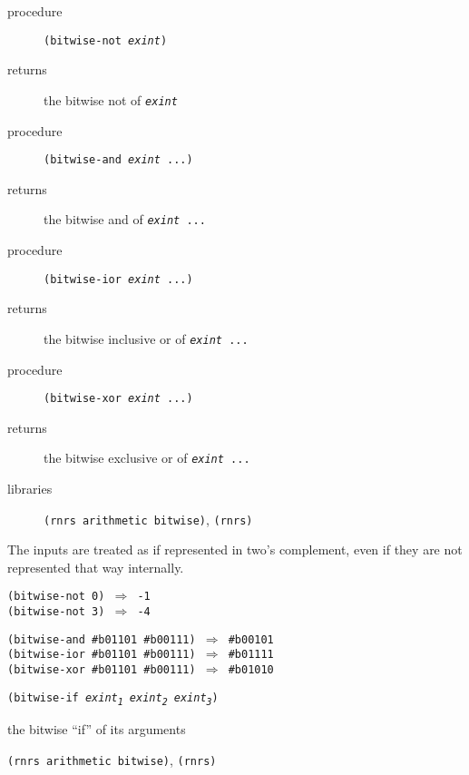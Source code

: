 \begin{description}

\label{objects_s134}\item[procedure] \texttt{(bitwise-not \textit{exint})}



\item[returns] the bitwise not of \texttt{\textit{exint}}


\item[procedure] \texttt{(bitwise-and \textit{exint} ...)}



\item[returns] the bitwise and of \texttt{\textit{exint} ...}


\item[procedure] \texttt{(bitwise-ior \textit{exint} ...)}



\item[returns] the bitwise inclusive or of \texttt{\textit{exint} ...}


\item[procedure] \texttt{(bitwise-xor \textit{exint} ...)}



\item[returns] the bitwise exclusive or of \texttt{\textit{exint} ...}


\item[libraries] \texttt{(rnrs arithmetic bitwise)}, \texttt{(rnrs)}
\end{description}


The inputs are treated as if represented in two's complement, even
if they are not represented that way internally.


\begin{alltt}
(bitwise-not 0) \(\Rightarrow\) -1
(bitwise-not 3) \(\Rightarrow\) -4

(bitwise-and \#{}b01101 \#{}b00111) \(\Rightarrow\) \#{}b00101
(bitwise-ior \#{}b01101 \#{}b00111) \(\Rightarrow\) \#{}b01111
(bitwise-xor \#{}b01101 \#{}b00111) \(\Rightarrow\) \#{}b01010
\end{alltt}

\begin{description}

\label{objects_s135}\item[procedure] \texttt{(bitwise-if \textit{exint\textsubscript{1}} \textit{exint\textsubscript{2}} \textit{exint\textsubscript{3}})}



\item[returns] the bitwise ``if'' of its arguments


\item[libraries] \texttt{(rnrs arithmetic bitwise)}, \texttt{(rnrs)}
\end{description}


